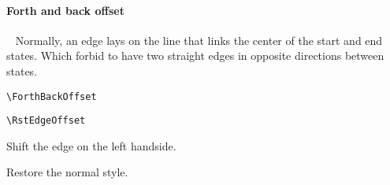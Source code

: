 \documentclass[11pt,twoside]{article}
\newlength{\ColoText}%
\newlength{\ColoFigu}%
\newlength{\parindenttemp} %
\newcommand{\noi}{\noindent}
\newcommand{\ee}{\text{\qquad}}               %
\newlength{\jsIndent}%
\begin{document}
\paragraph{Forth and back offset}
~
Normally, an edge lays on the line that links the center of the start 
and end states.
Which forbid to have two straight edges in opposite directions 
between states.

\noi 
\hspace*{-\jsIndent}
\begin{minipage}[t]{\ColoText}
        \par\vspace*{0mm}%
        \footnotesize
\verb+\ForthBackOffset+ \ee 
   
\medskip 
\verb+\RstEdgeOffset+ \ee 
   
\end{minipage}%
\hspace*{1.2em}%
\begin{minipage}[t]{\ColoFigu}%
\par\vspace*{0mm}%
Shift the edge on the left handside.

\smallskip 

Restore the normal style.
\end{minipage}%
\end{document}
